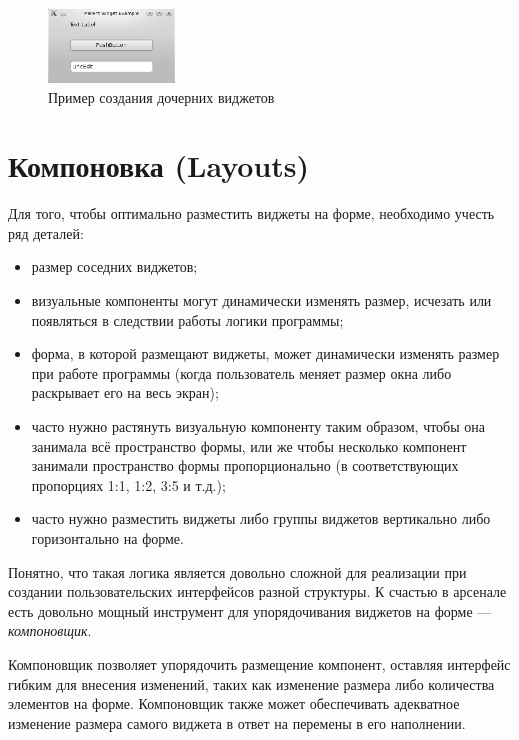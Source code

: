 \begin{figure}[htb]
\begin{center}
\includegraphics[width=0.3\textwidth]{img/ris_13_3}
\caption[Пример создания дочерних виджетов]{Пример создания дочерних виджетов}
\label{ch13:refDrawing2}
\end{center}
\end{figure}

\section[Компоновка (Layouts)]{Компоновка (Layouts)}
Для того, чтобы оптимально разместить виджеты на форме, необходимо учесть ряд деталей:

\begin{itemize}
\item размер соседних виджетов;
\item визуальные компоненты могут динамически изменять размер, исчезать или появляться в следствии работы логики
программы;
\item форма, в которой размещают виджеты, может динамически изменять размер при  работе программы (когда пользователь
меняет размер окна либо раскрывает его на весь экран);
\item часто нужно растянуть визуальную компоненту таким образом, чтобы она занимала всё пространство формы, или же чтобы
несколько компонент занимали пространство формы пропорционально (в соответствующих пропорциях 1:1, 1:2, 3:5 и т.д.);
\item часто нужно разместить виджеты либо группы виджетов вертикально либо горизонтально на форме.
\end{itemize}

Понятно, что такая логика является довольно сложной для реализации при создании пользовательских интерфейсов разной
структуры. К счастью в арсенале  есть довольно мощный инструмент для упорядочивания виджетов на форме ---
\emph{компоновщик}.

Компоновщик позволяет упорядочить размещение компонент, оставляя интерфейс гибким для внесения изменений, таких как
изменение размера либо количества элементов на форме. Компоновщик также может обеспечивать адекватное изменение размера
самого виджета в ответ на перемены в его наполнении.

